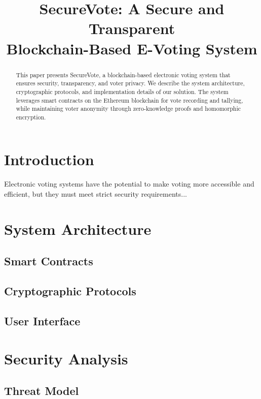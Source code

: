 \documentclass[conference]{IEEEtran}
\begin{document}
\title{SecureVote: A Secure and Transparent \\Blockchain-Based E-Voting System}

\author{
}

\maketitle

\begin{abstract}
This paper presents SecureVote, a blockchain-based electronic voting system that ensures security, transparency, and voter privacy. We describe the system architecture, cryptographic protocols, and implementation details of our solution. The system leverages smart contracts on the Ethereum blockchain for vote recording and tallying, while maintaining voter anonymity through zero-knowledge proofs and homomorphic encryption.
\end{abstract}

\section{Introduction}
Electronic voting systems have the potential to make voting more accessible and efficient, but they must meet strict security requirements...

\section{System Architecture}
\subsection{Smart Contracts}
\subsection{Cryptographic Protocols}
\subsection{User Interface}

\section{Security Analysis}
\subsection{Threat Model}
\end{document}
